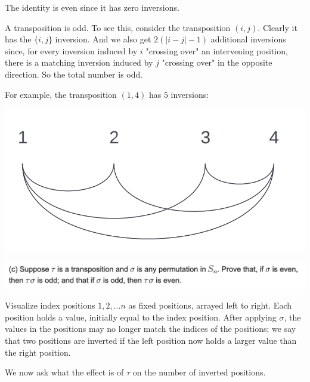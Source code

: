 The identity is even since it has zero inversions.

A transposition is odd. To see this, consider the transposition $(i, j)$. Clearly it has
the $\{i, j\}$ inversion. And we also get $2(|i - j| - 1)$ additional inversions since, for every
inversion induced by $i$ "crossing over" an intervening position, there is a matching inversion
induced by $j$ "crossing over" in the opposite direction. So the total number is odd.

For example, the transposition $(1, 4)$ has $5$ inversions:
\begin{mdframed}
\includegraphics[width=400pt]{img/abstract-algebra--nf--2-e92f.png}
\end{mdframed}




\begin{mdframed}
\includegraphics[width=400pt]{img/algebra--nf--2-179c.png}
\end{mdframed}

\begin{intuition}
  Visualize index positions $1, 2, \ldots n$ as fixed positions, arrayed left to right. Each position
  holds a value, initially equal to the index position. After applying $\sigma$, the values in the
  positions may no longer match the indices of the positions; we say that two positions are
  inverted if the left position now holds a larger value than the right position.

  We now ask what the effect is of $\tau$ on the number of inverted positions.
\end{intuition}

